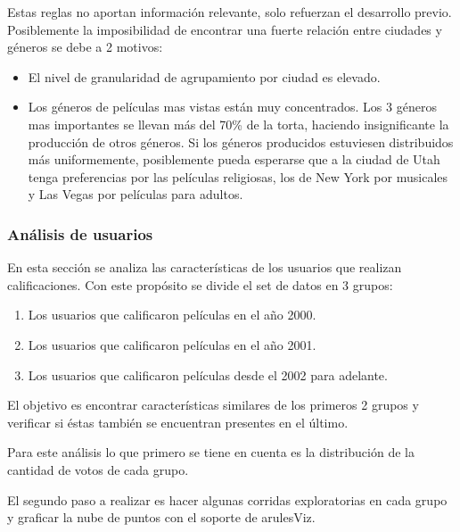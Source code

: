 \documentclass[journal]{IEEEtran}
\begin{document}
Estas reglas no aportan información relevante, solo refuerzan el desarrollo
previo. Posiblemente la imposibilidad de encontrar una fuerte relación entre
ciudades y géneros se debe a 2 motivos:
\begin{itemize}
\item El nivel de granularidad de agrupamiento por ciudad es elevado.
\item Los géneros de películas mas vistas están muy concentrados. Los 3 géneros
mas importantes se llevan más del 70\% de la torta, haciendo insignificante la
producción de otros géneros. Si los géneros producidos estuviesen
distribuidos más uniformemente, 
posiblemente pueda esperarse que a la ciudad de Utah tenga preferencias por las
películas religiosas, los de New York por musicales y Las Vegas por películas 
para adultos.
\end{itemize}




\subsubsection{Análisis de usuarios}
En esta sección se analiza las características de los usuarios que realizan
calificaciones. Con este propósito se divide el set de datos en 3 grupos:
\begin{enumerate}
\item Los usuarios que calificaron películas en el año 2000.
\item Los usuarios que calificaron películas en el año 2001.
\item Los usuarios que calificaron películas desde el 2002 para adelante.
\end{enumerate}
El objetivo es encontrar características similares de los primeros 2 grupos
y verificar si éstas también se encuentran presentes en el último.

Para este análisis lo que primero se tiene en cuenta es la distribución
de la cantidad de votos de cada grupo.

El segundo paso a realizar es hacer algunas corridas exploratorias en cada
grupo y graficar la nube de puntos con el soporte de arulesViz. 
\end{document}
